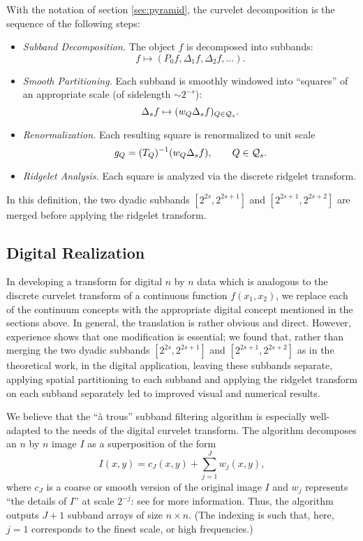 With the notation of section \ref{sec:pyramid}, the curvelet
decomposition is the sequence of the following steps:
\begin{itemize}
     \item {\it Subband Decomposition.}  The object $f$ is
     decomposed into subbands:
     \[
       f \mapsto (P_0 f, \Delta_1 f , \Delta_2 f , \dots ) .
     \]
\item {\it Smooth Partitioning.} Each subband is smoo\-thly win\-do\-wed
      into ``squares'' of an appropriate scale (of sidelength $\sim
      2^{-s}$):
     \[
        \Delta_s f \mapsto ( w_Q    \Delta_s f )_{Q \in {\cal Q}_s} .
     \]
     \item {\it Renormalization.} Each resulting square is renormalized to
unit scale
     \begin{equation}
      \label{eq:gQ}
        g_Q =  (T_Q)^{-1}(w_Q \Delta_s f ),  \qquad {Q \in {\cal Q}_s} .
     \end{equation}
\item {\it Ridgelet Analysis.} Each square is analyzed via the
      discrete ridgelet transform.
\end{itemize}

In this definition, the two dyadic subbands $[2^{2s}, 2^{2s+1}]$ and
$[2^{2s+1}, 2^{2s+2}]$ are merged before applying the ridgelet
transform.
\subsection{Digital Realization}

In developing a transform for digital $n$ by $n$ data
which is analogous to the discrete curvelet transform of a
continuous function $f(x_1,x_2)$,
we replace each of the continuum concepts
with the appropriate digital concept mentioned in the sections above.
In general, the translation is rather obvious and direct. However,
experience shows that one modification is essential;
we found that, rather than merging the two
dyadic subbands $[2^{2s}, 2^{2s+1}]$ and
$[2^{2s+1}, 2^{2s+2}]$ as in the theoretical work,
in the digital application, leaving these subbands separate,
applying spatial partitioning to each subband
and applying the ridgelet transform on
each subband separately led to improved visual and numerical results.

We believe that the ``\`a trous'' subband filtering algorithm is
especially
well-adapted to the needs of the digital curvelet transform.
The algorithm decomposes an $n$ by $n$ image $I$ as a superposition of
the form
\[
I(x,y) = c_{J}(x,y) + \sum_{j=1}^{J} w_j(x,y),
\]
where $c_{J}$ is a coarse or smooth version of the original image $I$
and $w_j$ represents ``the details of $I$'' at scale $2^{-j}$: see
\cite{starck:book98} for more information. Thus, the algorithm outputs
$J+1$ subband arrays of size $n \times n$. (The indexing is such that,
here, $j = 1$ corresponds to the finest scale, or high frequencies.)

